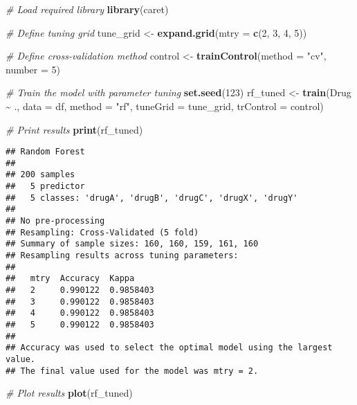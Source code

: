 \documentclass[
]{article}
\newenvironment{Shaded}{\begin{snugshade}}{\end{snugshade}}
\newcommand{\AttributeTok}[1]{\textcolor[rgb]{0.13,0.29,0.53}{#1}}
\newcommand{\CommentTok}[1]{\textcolor[rgb]{0.56,0.35,0.01}{\textit{#1}}}
\newcommand{\DecValTok}[1]{\textcolor[rgb]{0.00,0.00,0.81}{#1}}
\newcommand{\FunctionTok}[1]{\textcolor[rgb]{0.13,0.29,0.53}{\textbf{#1}}}
\newcommand{\NormalTok}[1]{#1}
\newcommand{\OtherTok}[1]{\textcolor[rgb]{0.56,0.35,0.01}{#1}}
\newcommand{\SpecialCharTok}[1]{\textcolor[rgb]{0.81,0.36,0.00}{\textbf{#1}}}
\newcommand{\StringTok}[1]{\textcolor[rgb]{0.31,0.60,0.02}{#1}}
\begin{document}
\begin{Shaded}
\begin{Highlighting}[]
\CommentTok{\# Load required library}
\FunctionTok{library}\NormalTok{(caret)}

\CommentTok{\# Define tuning grid}
\NormalTok{tune\_grid }\OtherTok{\textless{}{-}} \FunctionTok{expand.grid}\NormalTok{(}\AttributeTok{mtry =} \FunctionTok{c}\NormalTok{(}\DecValTok{2}\NormalTok{, }\DecValTok{3}\NormalTok{, }\DecValTok{4}\NormalTok{, }\DecValTok{5}\NormalTok{))}

\CommentTok{\# Define cross{-}validation method}
\NormalTok{control }\OtherTok{\textless{}{-}} \FunctionTok{trainControl}\NormalTok{(}\AttributeTok{method =} \StringTok{"cv"}\NormalTok{, }\AttributeTok{number =} \DecValTok{5}\NormalTok{)}

\CommentTok{\# Train the model with parameter tuning}
\FunctionTok{set.seed}\NormalTok{(}\DecValTok{123}\NormalTok{)}
\NormalTok{rf\_tuned }\OtherTok{\textless{}{-}} \FunctionTok{train}\NormalTok{(Drug }\SpecialCharTok{\textasciitilde{}}\NormalTok{ ., }\AttributeTok{data =}\NormalTok{ df, }\AttributeTok{method =} \StringTok{"rf"}\NormalTok{, }
                  \AttributeTok{tuneGrid =}\NormalTok{ tune\_grid, }
                  \AttributeTok{trControl =}\NormalTok{ control)}

\CommentTok{\# Print results}
\FunctionTok{print}\NormalTok{(rf\_tuned)}
\end{Highlighting}
\end{Shaded}

\begin{verbatim}
## Random Forest 
## 
## 200 samples
##   5 predictor
##   5 classes: 'drugA', 'drugB', 'drugC', 'drugX', 'drugY' 
## 
## No pre-processing
## Resampling: Cross-Validated (5 fold) 
## Summary of sample sizes: 160, 160, 159, 161, 160 
## Resampling results across tuning parameters:
## 
##   mtry  Accuracy  Kappa    
##   2     0.990122  0.9858403
##   3     0.990122  0.9858403
##   4     0.990122  0.9858403
##   5     0.990122  0.9858403
## 
## Accuracy was used to select the optimal model using the largest value.
## The final value used for the model was mtry = 2.
\end{verbatim}

\begin{Shaded}
\begin{Highlighting}[]
\CommentTok{\# Plot results}
\FunctionTok{plot}\NormalTok{(rf\_tuned)}
\end{Highlighting}
\end{Shaded}
\end{document}
